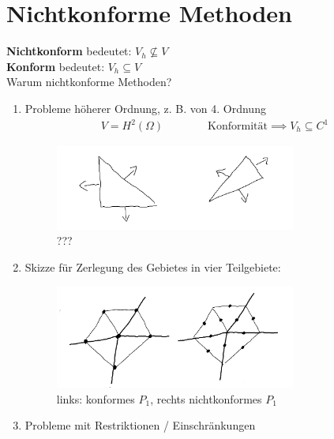 \section{Nichtkonforme Methoden}
\textbf{Nichtkonform} bedeutet: $V_h\not\subseteq V$\\
\textbf{Konform} bedeutet: $V_h\subseteq V$\\
Warum nichtkonforme Methoden?
\begin{enumerate}[label=(\roman*)]
\item Probleme höherer Ordnung, z. B. von 4. Ordnung
\begin{align*}
V=H^2(\Omega)\qquad\qquad%
\text{Konformität}\implies V_h\subseteq C^1
\end{align*}
\begin{figure}[!ht]
	\begin{center}
		\includegraphics[width=0.75\textwidth]{pics/Sketch4.png}
		\caption{???} %
		\label{Abb???}
	\end{center}
\end{figure}

\item Skizze für Zerlegung des Gebietes in vier Teilgebiete:
\begin{figure}[!ht]
	\begin{center}
		\includegraphics[width=0.75\textwidth]{pics/Sketch5.png}
		\caption{links: konformes $P_1$, rechts nichtkonformes $P_1$}
		\label{AbbNonconformingMethods}
	\end{center}
\end{figure}
\item Probleme mit Restriktionen / Einschränkungen
\end{enumerate}

